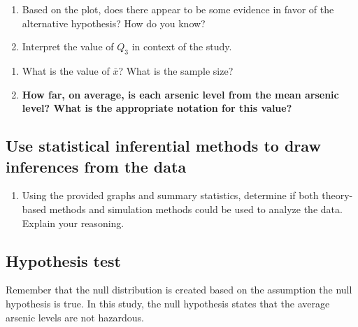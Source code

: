 \documentclass[
]{report}
\providecommand{\tightlist}{%
  \setlength{\itemsep}{0pt}\setlength{\parskip}{0pt}}
\begin{document}
\begin{enumerate}
\def\labelenumi{\arabic{enumi}.}
\setcounter{enumi}{4}
\item
  Based on the plot, does there appear to be some evidence in favor of the alternative hypothesis? How do you know?
  \vspace{0.4in}
\item
  Interpret the value of \(Q_3\) in context of the study.
\end{enumerate}

\vspace{0.8in}

\begin{enumerate}
\def\labelenumi{\arabic{enumi}.}
\setcounter{enumi}{6}
\item
  What is the value of \(\bar{x}\)? What is the sample size?
  \vspace{0.25in}
\item
  \textbf{How far, on average, is each arsenic level from the mean arsenic level? What is the appropriate notation for this value?}
\end{enumerate}

\vspace{0.4in}

\subsection*{Use statistical inferential methods to draw inferences from the data}\label{use-statistical-inferential-methods-to-draw-inferences-from-the-data-1}

\begin{enumerate}
\def\labelenumi{\arabic{enumi}.}
\setcounter{enumi}{8}
\tightlist
\item
  Using the provided graphs and summary statistics, determine if both theory-based methods and simulation methods could be used to analyze the data. Explain your reasoning.
\end{enumerate}

\vspace{1in}

\subsection*{Hypothesis test}\label{hypothesis-test}

Remember that the null distribution is created based on the assumption the null hypothesis is true. In this study, the null hypothesis states that the average arsenic levels are not hazardous.
\end{document}
